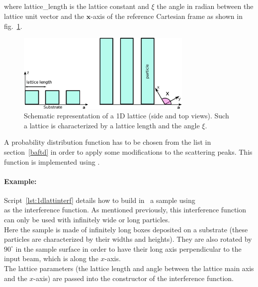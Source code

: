 \newpage
\subsection{}
where lattice\_length is the lattice constant and $\xi$ the angle in radian between the lattice unit vector and the $\mathbf{x}$-axis of the reference Cartesian frame as shown in fig.~\ref{fig:1dgrating}.

\begin{figure}[tb]
\begin{center}
\includegraphics[width=0.75\textwidth]{fig/drawing/1DGrating.pdf}
\end{center}
\caption{Schematic representation of a 1D lattice (side and top views). Such a lattice is characterized by a lattice length and the angle $\xi$.}
\label{fig:1dgrating}
\end{figure}


\vspace{12pt}
A probability distribution function  has to be chosen from the list in section~\ref{baftd} in order to apply some modifications to the scattering peaks. This function is implemented using .

\paragraph{Example:} Script~\ref{lst:1dlattinterf} details how to build in  \BornAgain\ a sample using\\  as the interference function. As mentioned previously, this interference function can only be used with infinitely wide or long particles.\\ Here the sample is made of infinitely long boxes deposited on a substrate (these particles are characterized by their widths and heights). They are also rotated by $90^{\circ}$  in the sample surface in order to have their long axis perpendicular to the input beam, which is along the $x$-axis.\\
 The lattice parameters (the lattice length and angle between the lattice main axis and the $x$-axis) are passed into the constructor of the interference function.

